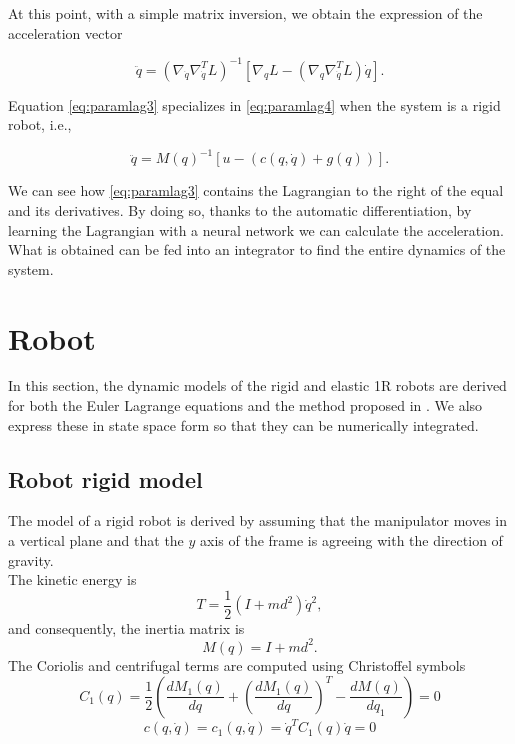 \documentclass[a4paper]{article}
\begin{document}
At this point, with a simple matrix inversion, we obtain the expression of the acceleration vector

\begin{equation}
    \label{eq:paramlag3}
    \ddot{q} = (\nabla_{\dot{q}}\nabla_{\dot{q}}^T L)^{-1} [\nabla_{q} L - (\nabla_{q}\nabla_{\dot{q}}^T L)\dot{q}].
\end{equation}

Equation \eqref{eq:paramlag3} specializes in \eqref{eq:paramlag4} when the system is a rigid robot, i.e.,

\begin{equation}
    \label{eq:paramlag4}
    \ddot{q} = M(q)^{-1}[u - (c(q,\dot{q}) + g(q))].
\end{equation}

We can see how \eqref{eq:paramlag3} contains the Lagrangian to the right of the equal and its derivatives. By doing so, thanks to the automatic differentiation, by learning the Lagrangian with a neural network we can calculate the acceleration. What is obtained can be fed into an integrator to find the entire dynamics of the system.


\section{Robot}
\label{sec:robot}
In this section, the dynamic models of the rigid and elastic 1R robots are derived for both the Euler Lagrange equations and the method proposed in \cite{lnncranmer}. We also express these in state space form so that they can be numerically integrated.

\subsection{Robot rigid model}
The model of a rigid robot is derived by assuming that the manipulator moves in a vertical plane and that the $y$ axis of the frame is agreeing with the direction of gravity.\\
The kinetic energy is
\begin{equation}
    \nonumber
    T = \frac{1}{2}(I+md^2)\dot{q}^2,
\end{equation}
and consequently, the inertia matrix is
\begin{equation}
    \nonumber
    M(q)=I+md^2.
\end{equation}
The Coriolis and centrifugal terms are computed using Christoffel symbols
\begin{equation}
    \nonumber
    C_1(q)=\frac{1}{2}\left(\frac{dM_1(q)}{dq}+\left(\frac{dM_1(q)}{dq}\right)^T-\frac{dM(q)}{dq_1}\right)=0
\end{equation}
\begin{equation}
    \nonumber
    c(q,\dot{q})=c_1(q,\dot{q})=\dot{q}^TC_1(q)\dot{q}=0
\end{equation}
\end{document}
